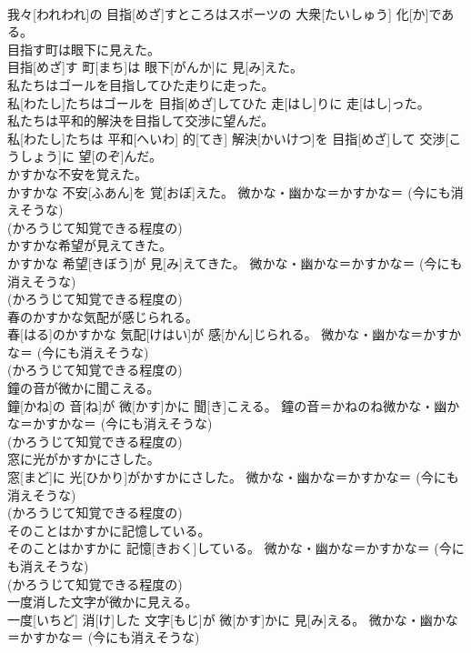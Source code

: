 \documentclass[8pt]{extreport}
\begin{document}
\begin{CJK}{UTF8}{min}
{\\	我々[われわれ]の 目指[めざ]すところはスポーツの 大衆[たいしゅう] 化[か]である。	
\\	目指す町は眼下に見えた。	
\\	目指[めざ]す 町[まち]は 眼下[がんか]に 見[み]えた。	
\\	私たちはゴールを目指してひた走りに走った。	
\\	私[わたし]たちはゴールを 目指[めざ]してひた 走[はし]りに 走[はし]った。	
\\	私たちは平和的解決を目指して交渉に望んだ。	
\\	私[わたし]たちは 平和[へいわ] 的[てき] 解決[かいけつ]を 目指[めざ]して 交渉[こうしょう]に 望[のぞ]んだ。	
\\	かすかな不安を覚えた。	
\\	かすかな 不安[ふあん]を 覚[おぼ]えた。	微かな・幽かな＝かすかな＝ (今にも消えそうな) 
\\	(かろうじて知覚できる程度の) 
\\	かすかな希望が見えてきた。	
\\	かすかな 希望[きぼう]が 見[み]えてきた。	微かな・幽かな＝かすかな＝ (今にも消えそうな) 
\\	(かろうじて知覚できる程度の) 
\\	春のかすかな気配が感じられる。	
\\	春[はる]のかすかな 気配[けはい]が 感[かん]じられる。	微かな・幽かな＝かすかな＝ (今にも消えそうな) 
\\	(かろうじて知覚できる程度の) 
\\	鐘の音が微かに聞こえる。	
\\	鐘[かね]の 音[ね]が 微[かす]かに 聞[き]こえる。	鐘の音＝かねのね微かな・幽かな＝かすかな＝ (今にも消えそうな) 
\\	(かろうじて知覚できる程度の) 
\\	窓に光がかすかにさした。	
\\	窓[まど]に 光[ひかり]がかすかにさした。	微かな・幽かな＝かすかな＝ (今にも消えそうな) 
\\	(かろうじて知覚できる程度の) 
\\	そのことはかすかに記憶している。	
\\	そのことはかすかに 記憶[きおく]している。	微かな・幽かな＝かすかな＝ (今にも消えそうな) 
\\	(かろうじて知覚できる程度の) 
\\	一度消した文字が微かに見える。	
\\	一度[いちど] 消[け]した 文字[もじ]が 微[かす]かに 見[み]える。	微かな・幽かな＝かすかな＝ (今にも消えそうな) 
}
\end{CJK}
\end{document}
